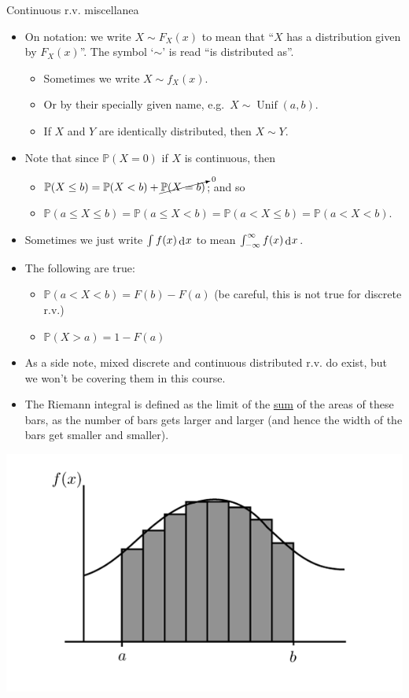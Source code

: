 \documentclass[
]{book}
\providecommand{\tightlist}{%
  \setlength{\itemsep}{0pt}\setlength{\parskip}{0pt}}
\DeclareMathOperator{\Unif}{Unif}
\newcommand{\bbP}{\mathbb{P}}
\DeclareMathOperator{\dd}{d}
\newcommand{\dint}{\dd\hspace{0.5pt}\!}
\theoremstyle{definition}
\theoremstyle{definition}
\theoremstyle{definition}
\theoremstyle{definition}
\theoremstyle{remark}
\begin{document}
Continuous r.v. miscellanea

\begin{itemize}
\item
  On notation: we write \(X \sim F_X(x)\) to mean that ``\(X\) has a distribution given by \(F_X(x)\)''. The symbol `\(\sim\)' is read ``is distributed as''.

  \begin{itemize}
  \tightlist
  \item
    Sometimes we write \(X \sim f_X(x)\).
  \item
    Or by their specially given name, e.g.~\(X\sim \Unif(a,b)\).
  \item
    If \(X\) and \(Y\) are identically distributed, then \(X\sim Y\).
  \end{itemize}
\item
  Note that since \(\bbP(X=0)\) if \(X\) is continuous, then

  \begin{itemize}
  \tightlist
  \item
    \(\bbP(X \leq b) = \bbP(X <b) + \cancelto{0}{\bbP(X=b)}\); and so
  \item
    \(\bbP(a \leq X \leq b) = \bbP(a \leq X < b) = \bbP(a < X \leq b) = \bbP(a < X < b)\).
  \end{itemize}
\item
  Sometimes we just write \(\int f(x) \dint x\) to mean \(\int_{-\infty}^{\infty} f(x) \dint x\).
\item
  The following are true:

  \begin{itemize}
  \tightlist
  \item
    \(\bbP(a<X<b) = F(b) - F(a)\) (be careful, this is not true for discrete r.v.)
  \item
    \(\bbP(X > a) = 1 - F(a)\)
  \end{itemize}
\item
  As a side note, mixed discrete and continuous distributed r.v. do exist, but we won't be covering them in this course.
\item
  The Riemann integral is defined as the limit of the \underline{sum} of the areas of these bars, as the number of bars gets larger and larger (and hence the width of the bars get smaller and smaller).
\end{itemize}

\includegraphics{figure/riemann_integration.png}
\end{document}
